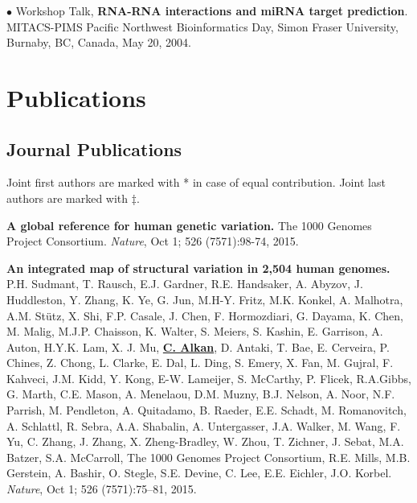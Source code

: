 \documentclass[margin,line]{res}
\newenvironment{list2}{
  \begin{list}{$\bullet$}{%
      \setlength{\itemsep}{0in}
      \setlength{\parsep}{0in} \setlength{\parskip}{0in}
      \setlength{\topsep}{0in} \setlength{\partopsep}{0in} 
      \setlength{\leftmargin}{0.2in}}}{\end{list}}
\newcommand{\calkan}{{\bf {\underline{C. Alkan}}}}
\begin{document}
\begin{resume}
\begin{list2}
  Workshop Talk, {\bf RNA-RNA interactions and miRNA target prediction}.
  MITACS-PIMS Pacific Northwest Bioinformatics Day, Simon Fraser University, Burnaby, BC, Canada, 
  May 20, 2004.

 
\end{list2}


       \section{\sc Publications}
                                       
                                       \vspace{-0.5cm}
                                       
                                       \subsection{\small \sc Journal Publications}
                                       \vspace{-0.6cm}
                                       
                                       \small{
                                         Joint first authors are marked with * in case of equal contribution. Joint last authors are marked with $\ddag$.
                                       }


  \vspace{-.2cm}        
  {\bf A global reference for human genetic variation.} The 1000 Genomes Project Consortium.  {\em Nature}, Oct 1; 526 (7571):98-74, 2015.


  \vspace{-.2cm}        
  {\bf An integrated map of structural variation in 2,504 human genomes.}
  P.H. Sudmant, T. Rausch, E.J. Gardner,  R.E. Handsaker, A. Abyzov, J. Huddleston, Y. Zhang, K. Ye, G. Jun, M.H-Y. Fritz, M.K. Konkel, A. Malhotra, A.M. Stütz, X. Shi, F.P. Casale, J. Chen, 
  F. Hormozdiari, G. Dayama, K. Chen, M. Malig, M.J.P. Chaisson, K. Walter, S. Meiers, S. Kashin, E. Garrison, A. Auton, H.Y.K. Lam, X. J. Mu, \calkan, D. Antaki, T. Bae, E. Cerveira, P. Chines, Z. Chong, 
  L. Clarke, E. Dal, L. Ding, S. Emery, X. Fan, M. Gujral, F. Kahveci, J.M. Kidd, Y. Kong, E-W. Lameijer, S. McCarthy, P. Flicek, R.A.Gibbs, G. Marth, C.E. Mason, A. Menelaou, D.M. Muzny, 
  B.J. Nelson, A. Noor, N.F. Parrish, M. Pendleton, A. Quitadamo, B. Raeder, E.E. Schadt, M. Romanovitch, A. Schlattl, R. Sebra, A.A. Shabalin, A. Untergasser, 
  J.A. Walker, M. Wang, F. Yu, C. Zhang, J. Zhang, X. Zheng-Bradley, W. Zhou, T. Zichner, J. Sebat, M.A. Batzer, S.A. McCarroll, 
  The 1000 Genomes Project Consortium, R.E. Mills, M.B. Gerstein, A. Bashir, O. Stegle, S.E. Devine, C. Lee, E.E. Eichler, J.O. Korbel. 
  {\em Nature}, Oct 1; 526 (7571):75–81, 2015.


\end{resume}
\end{document}
